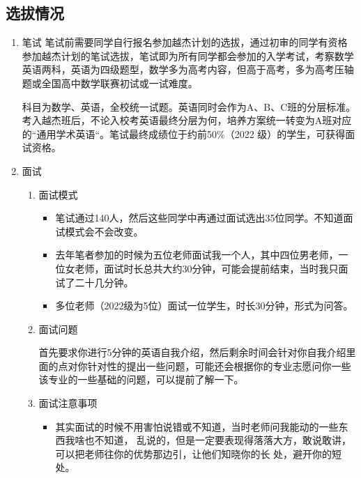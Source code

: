 \documentclass[zihao=-4,fontset=none]{Beautybook-CN}
\begin{document}
\subsection{选拔情况} 
\begin{enumerate}
	\item 笔试
	      笔试前需要同学自行报名参加越杰计划的选拔，通过初审的同学有资格参加越杰计划的笔试选拔，笔试即为所有同学都会参加的入学考试，考察数学英语两科，英语为四级题型，数学多为高考内容，但高于高考，多为高考压轴题或全国高中数学联赛初试或一试难度。
	      
	      科目为数学、英语，全校统一试题。英语同时会作为A、B、C班的分层标准。考入越杰班后，不论入校考英语最终分层为何，培养方案统一转变为A班对应的“通用学术英语“。笔试最终成绩位于约前50\%（2022 级）的学生，可获得面试资格。
	      	      	      
	\item 面试
	      \begin{enumerate}
	      	\item 面试模式
	      	      \begin{itemize}
	      	      	\item 笔试通过140人，然后这些同学中再通过面试选出35位同学。不知道面试模式会不会改变。
	      	      	      
	      	      	\item 去年笔者参加的时候为五位老师面试我一个人，其中四位男老师，一位女老师，面试时长总共大约30分钟，可能会提前结束，当时我只面试了二十几分钟。
	      	      	      
	      	      	\item 多位老师（2022级为5位）面试一位学生，时长30分钟，形式为问答。
	      	      \end{itemize}  	          
	      	      	      	          
	      	\item 面试问题
	      	      	      	      	      	          
	      	      首先要求你进行5分钟的英语自我介绍，然后剩余时间会针对你自我介绍里面的点对你针对性的提出一些问题，可能还会根据你的专业志愿问你一些该专业的一些基础的问题，可以提前了解一下。
	      	      	      	      	      	          
	      	\item 面试注意事项
	      	      \begin{itemize}
	      	      	\item 其实面试的时候不用害怕说错或不知道，当时老师问我能动的一些东西我啥也不知道， 乱说的，但是一定要表现得落落大方，敢说敢讲，可以把老师往你的优势那边引，让他们知晓你的长 处，避开你的短处。
	      	      	      

\end{itemize}
\end{enumerate}
\end{enumerate}
\end{document}
